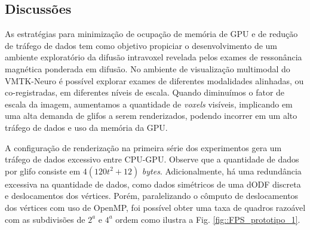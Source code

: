 \subsection{Discussões}


As estratégias para minimização de ocupação de memória de GPU e de redução de tráfego de dados tem como objetivo propiciar o desenvolvimento de um ambiente exploratório da difusão intravoxel revelada pelos exames de ressonância magnética ponderada em difusão. No ambiente de visualização multimodal do VMTK-Neuro \cite{VMTKNeuro} é possível explorar exames de diferentes modalidades alinhadas, ou co-registradas, em diferentes níveis de escala. Quando diminuímos o fator de escala da imagem, aumentamos a quantidade de \textit{voxels} visíveis, implicando em uma alta demanda de glifos a serem renderizados, podendo incorrer em um alto tráfego de dados e uso da memória da GPU.


A configuração de renderização na primeira série dos experimentos gera um tráfego de dados excessivo entre CPU-GPU. Observe que a quantidade de dados por glifo consiste em $4(120t^2 + 12)$ \textit{bytes}. Adicionalmente, há uma redundância excessiva na quantidade de dados, como dados simétricos de uma dODF discreta e deslocamentos dos vértices. Porém, paralelizando o cômputo de deslocamentos dos vértices com uso de OpenMP, foi possível obter uma taxa de quadros razoável com as subdivisões de $2^a$ e $4^a$ ordem como ilustra a Fig. \ref{fig::FPS_prototipo_1}.

